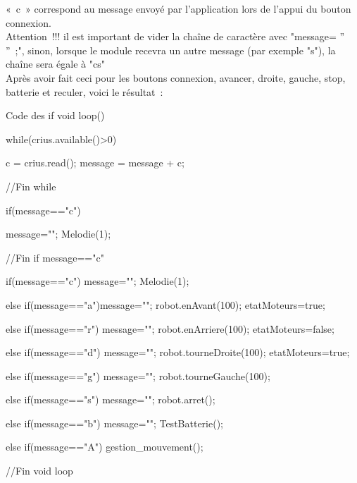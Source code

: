 « c » correspond au message envoyé par l'application lors de l'appui du bouton connexion.\\

{\color{red} Attention !!! il est important de vider la chaîne de caractère avec "message= '' '' ;", sinon, lorsque le module recevra un autre message (par exemple "s"), la chaîne sera égale à "cs"} \\

Après avoir fait ceci pour les boutons connexion, avancer, droite, gauche, stop, batterie et reculer, voici le résultat :


\begin{Cpp}{Code des if}
void loop() {
 
    while(crius.available()>0) {
    
        c = crius.read();
        message = message + c;
    }//Fin while
    
    if(message=="c") {
    
        message="";
        Melodie(1);
    }//Fin if message=="c"

  if(message=="c")  {message=""; 
                    Melodie(1);}
                                
  else if(message=="a"){message="";             
                        robot.enAvant(100);
                        etatMoteurs=true;}
                                
  else if(message=="r")   {message="";
                           robot.enArriere(100);
                           etatMoteurs=false;}  
                                                      
  else if(message=="d")   {message="";            
                           robot.tourneDroite(100);
                           etatMoteurs=true;}
                                
  else if(message=="g")    {message="";           
                            robot.tourneGauche(100);} 
                                
  else if(message=="s") {message="";          
                              robot.arret();}
                                
  else if(message=="b")  {message="";              
                          TestBatterie();}        
                                                           
  else if(message=="A")  {gestion_mouvement();}   
  
  }//Fin void loop
\end{Cpp}

